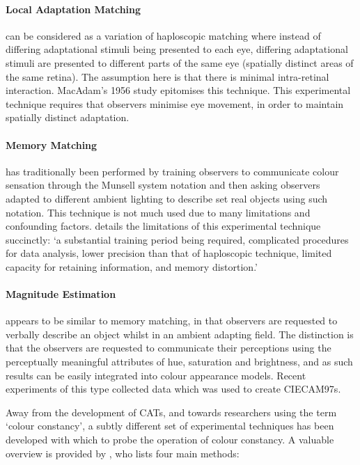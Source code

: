 \paragraph{Local Adaptation Matching} can be considered as a variation of haploscopic matching where instead of differing adaptational stimuli being presented to each eye, differing adaptational stimuli are presented to different parts of the same eye (spatially distinct areas of the same retina). The assumption here is that there is minimal intra-retinal interaction. MacAdam's 1956 study \citep{macadam_chromatic_1956} epitomises this technique. This experimental technique requires that observers minimise eye movement, in order to maintain spatially distinct adaptation.

\paragraph{Memory Matching} has traditionally been performed by training observers to communicate colour sensation through the Munsell system notation \citep{helson_object-color_1952,lam_metamerism_1985} and then asking observers adapted to different ambient lighting to describe set real objects using such notation. This technique is not much used due to many limitations and confounding factors. \citet{luo_review_2000} details the limitations of this experimental technique succinctly: `a substantial training period being required, complicated procedures for data analysis, lower precision than that of haploscopic technique, limited capacity for retaining information, and memory distortion.'

\paragraph{Magnitude Estimation} appears to be similar to memory matching, in that observers are requested to verbally describe an object whilst in an ambient adapting field. The distinction is that the observers are requested to communicate their perceptions using the perceptually meaningful attributes of hue, saturation and brightness, and as such results can be easily integrated into colour appearance models. Recent experiments \citep{kuo_various_1995,xu_testing_1997,luo_quantifying_1991-1,luo_quantifying_1991,luo_quantifying_1993-1,luo_quantifying_1993} of this type collected data which was used to create CIECAM97s.

Away from the development of \glspl{CAT}, and towards researchers using the term `colour constancy', a subtly different set of experimental techniques has been developed with which to probe the operation of colour constancy. A valuable overview is provided by \citet{foster_color_2011}, who lists four main methods:

